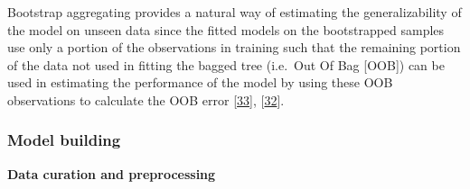 \documentclass[
  10pt,
]{article}
\begin{document}
Bootstrap aggregating provides a natural way of estimating the generalizability of the model on unseen data since the fitted models on the bootstrapped samples use only a portion of the observations in training such that the remaining portion of the data not used in fitting the bagged tree (i.e.~Out Of Bag {[}OOB{]}) can be used in estimating the performance of the model by using these OOB observations to calculate the OOB error {[}\protect\hyperlink{ref-Hastie2009}{33}{]}, {[}\protect\hyperlink{ref-James2013}{32}{]}.

\hypertarget{model-building}{%
\subsubsection{Model building}\label{model-building}}

\textbf{Data curation and preprocessing}
\end{document}
